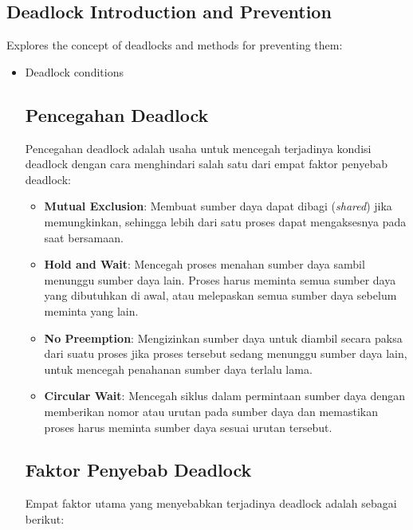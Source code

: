 \documentclass[12pt]{article}
\begin{document}
\subsection{Deadlock Introduction and Prevention}
Explores the concept of deadlocks and methods for preventing them:
\begin{itemize}
    \item Deadlock conditions
    \subsection{Pencegahan Deadlock}
Pencegahan deadlock adalah usaha untuk mencegah terjadinya kondisi deadlock dengan cara menghindari salah satu dari empat faktor penyebab deadlock:

\begin{itemize}
    \item \textbf{Mutual Exclusion}: 
    Membuat sumber daya dapat dibagi (\textit{shared}) jika memungkinkan, sehingga lebih dari satu proses dapat mengaksesnya pada saat bersamaan.
    
    \item \textbf{Hold and Wait}: 
    Mencegah proses menahan sumber daya sambil menunggu sumber daya lain. Proses harus meminta semua sumber daya yang dibutuhkan di awal, atau melepaskan semua sumber daya sebelum meminta yang lain.
    
    \item \textbf{No Preemption}: 
    Mengizinkan sumber daya untuk diambil secara paksa dari suatu proses jika proses tersebut sedang menunggu sumber daya lain, untuk mencegah penahanan sumber daya terlalu lama.
    
    \item \textbf{Circular Wait}: 
    Mencegah siklus dalam permintaan sumber daya dengan memberikan nomor atau urutan pada sumber daya dan memastikan proses harus meminta sumber daya sesuai urutan tersebut.
\end{itemize}

\subsection{Faktor Penyebab Deadlock}
Empat faktor utama yang menyebabkan terjadinya deadlock adalah sebagai berikut:


\end{itemize}
\end{document}
